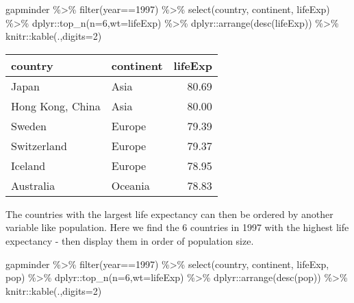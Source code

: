 \documentclass[
]{book}
\newenvironment{Shaded}{\begin{snugshade}}{\end{snugshade}}
\newcommand{\AttributeTok}[1]{\textcolor[rgb]{0.77,0.63,0.00}{#1}}
\newcommand{\DecValTok}[1]{\textcolor[rgb]{0.00,0.00,0.81}{#1}}
\newcommand{\FunctionTok}[1]{\textcolor[rgb]{0.00,0.00,0.00}{#1}}
\newcommand{\NormalTok}[1]{#1}
\newcommand{\SpecialCharTok}[1]{\textcolor[rgb]{0.00,0.00,0.00}{#1}}
\begin{document}
\begin{Shaded}
\begin{Highlighting}[]
\NormalTok{gapminder }\SpecialCharTok{\%\textgreater{}\%} 
  \FunctionTok{filter}\NormalTok{(year}\SpecialCharTok{==}\DecValTok{1997}\NormalTok{) }\SpecialCharTok{\%\textgreater{}\%}  
  \FunctionTok{select}\NormalTok{(country, continent, lifeExp) }\SpecialCharTok{\%\textgreater{}\%}
\NormalTok{  dplyr}\SpecialCharTok{::}\FunctionTok{top\_n}\NormalTok{(}\AttributeTok{n=}\DecValTok{6}\NormalTok{,}\AttributeTok{wt=}\NormalTok{lifeExp) }\SpecialCharTok{\%\textgreater{}\%}
\NormalTok{  dplyr}\SpecialCharTok{::}\FunctionTok{arrange}\NormalTok{(}\FunctionTok{desc}\NormalTok{(lifeExp)) }\SpecialCharTok{\%\textgreater{}\%}
\NormalTok{  knitr}\SpecialCharTok{::}\FunctionTok{kable}\NormalTok{(.,}\AttributeTok{digits=}\DecValTok{2}\NormalTok{)}
\end{Highlighting}
\end{Shaded}

\begin{tabular}{l|l|r}
\hline
country & continent & lifeExp\\
\hline
Japan & Asia & 80.69\\
\hline
Hong Kong, China & Asia & 80.00\\
\hline
Sweden & Europe & 79.39\\
\hline
Switzerland & Europe & 79.37\\
\hline
Iceland & Europe & 78.95\\
\hline
Australia & Oceania & 78.83\\
\hline
\end{tabular}

The countries with the largest life expectancy can then be ordered by another variable like population. Here we find the 6 countries in 1997 with the highest life expectancy - then display them in order of population size.

\begin{Shaded}
\begin{Highlighting}[]
\NormalTok{gapminder }\SpecialCharTok{\%\textgreater{}\%} 
  \FunctionTok{filter}\NormalTok{(year}\SpecialCharTok{==}\DecValTok{1997}\NormalTok{) }\SpecialCharTok{\%\textgreater{}\%}  
  \FunctionTok{select}\NormalTok{(country, continent, lifeExp, pop) }\SpecialCharTok{\%\textgreater{}\%}
\NormalTok{  dplyr}\SpecialCharTok{::}\FunctionTok{top\_n}\NormalTok{(}\AttributeTok{n=}\DecValTok{6}\NormalTok{,}\AttributeTok{wt=}\NormalTok{lifeExp) }\SpecialCharTok{\%\textgreater{}\%}
\NormalTok{  dplyr}\SpecialCharTok{::}\FunctionTok{arrange}\NormalTok{(}\FunctionTok{desc}\NormalTok{(pop)) }\SpecialCharTok{\%\textgreater{}\%}
\NormalTok{  knitr}\SpecialCharTok{::}\FunctionTok{kable}\NormalTok{(.,}\AttributeTok{digits=}\DecValTok{2}\NormalTok{)}
\end{Highlighting}
\end{Shaded}
\end{document}
